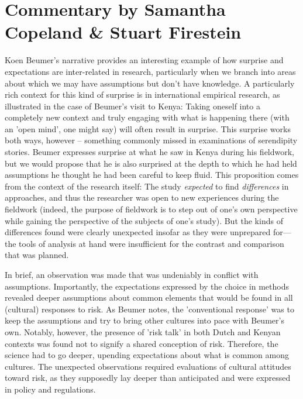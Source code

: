\documentclass[authordate, commentary]{jote-new-article}
\author[1]{\mbox{Samantha Copeland\orcid{0000-0002-6946-7165}}}
\affil[1]{Delft University of Technology, Delft, the Netherlands}
\author[2]{\mbox{Stuart Firestein\orcid{0000-0003-1774-5853}}}
\affil[2]{Columbia University, New York, the United States}
\begin{document}
\begin{frontmatter}
  \maketitle
  \begin{abstract}
    \printabstracttext
  \end{abstract}
\end{frontmatter}


	\section{Commentary by Samantha Copeland \& Stuart Firestein}





	Koen Beumer's narrative provides an interesting example of how surprise and expectations are inter-related in research, particularly when we branch into areas about which we may have assumptions but don't have knowledge. A particularly rich context for this kind of surprise is in international empirical research, as illustrated in the case of Beumer's visit to Kenya: Taking oneself into a completely new context and truly engaging with what is happening there (with an 'open mind', one might say) will often result in surprise. This surprise works both ways, however -- something commonly missed in examinations of serendipity stories. Beumer expresses surprise at what he saw in Kenya during his fieldwork, but we would propose that he is also surprised at the depth to which he had held assumptions he thought he had been careful to keep fluid. This proposition comes from the context of the research itself: The study \emph{expected} to find \emph{differences} in approaches, and thus the researcher was open to new experiences during the fieldwork (indeed, the purpose of fieldwork is to step out of one's own perspective while gaining the perspective of the subjects of one's study). But the kinds of differences found were clearly unexpected insofar as they were unprepared for—the tools of analysis at hand were insufficient for the contrast and comparison that was planned.

	In brief, an observation was made that was undeniably in conflict with assumptions. Importantly, the expectations expressed by the choice in methods revealed deeper assumptions about common elements that would be found in all (cultural) responses to risk. As Beumer notes, the 'conventional response' was to keep the assumptions and try to bring other cultures into pace with Beumer's own. Notably, however, the presence of 'risk talk' in both Dutch and Kenyan contexts was found not to signify a shared conception of risk. Therefore, the science had to go deeper, upending expectations about what is common among cultures. The unexpected observations required evaluations of cultural attitudes toward risk, as they supposedly lay deeper than anticipated and were expressed in policy and regulations.
\end{document}
